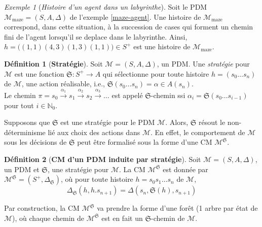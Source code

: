 \documentclass[12pt,a4paper]{report}
\theoremstyle{definition}%
\newtheorem{definition}{Définition}[chapter]
\theoremstyle{remark}
\newtheorem{example}{Exemple}[chapter]
\begin{document}
\begin{example}[\textit{Histoire d'un agent dans un labyrinthe}]
	Soit le PDM $\mathcal{M}_{\text{maze}} = (S, A, \Delta)$ de l'exemple \ref{maze-agent}.
	Une histoire de $\mathcal{M}_{\text{maze}}$ correspond, dans cette situation,
	à la succession de cases qui forment un chemin fini de l'agent lorsqu'il se deplace dans le
	labyrinthe. Ainsi,
	$
		h = \big( (1, 1) (4, 3) (1, 3) (1, 1) \big) \in S^+
	$
	est une histoire de $\mathcal{M}_{\text{maze}}$.
\end{example}

\begin{definition}[\textbf{Stratégie}]
	Soit $\mathcal{M} = (S, A, \Delta)$, un PDM. Une \textit{stratégie} pour $\mathcal{M}$
	est une fonction
	$\mathfrak{S} : S^+ \rightarrow A$
	qui sélectionne pour toute histoire $h = (s_0 \dots s_n)$ de $\mathcal{M}$, une action réalisable, i.e., $\mathfrak{S}(s_0 \dots s_n) = \alpha \in A(s_n)$.
	\\Le chemin $\pi = s_0 \xrightarrow{\alpha_1} s_1 \xrightarrow{\alpha_2} s_2 \xrightarrow{\alpha_3} \dots$
	est appelé $\mathfrak{S}$-chemin ssi $\alpha_i = \mathfrak{S}(s_0 \dots s_{i-1})$
	pour tout $i \in \mathbb{N}_0$.
\end{definition}

Supposons que $\mathfrak{S}$ est une stratégie pour le PDM $\mathcal{M}$. Alors,
$\mathfrak{S}$ résout le non-déterminisme lié aux choix des actions dans $\mathcal{M}$.
En effet, le comportement de $\mathcal{M}$ sous les décisions de $\mathfrak{S}$
peut être formalisé sous la forme d'une CM $\mathcal{M}^{\mathfrak{S}}$.

\begin{definition}[\textbf{CM d'un PDM induite par stratégie}]
Soit $\mathcal{M} = (S, A, \Delta)$, un PDM et $\mathfrak{S}$, une stratégie pour
$\mathcal{M}$. La CM $\mathcal{M}^\mathfrak{S}$ est donnée par
$ \mathcal{M}^\mathfrak{S} = (S^+, \Delta_\mathfrak{S}) $, où pour toute histoire
$h = s_0 s_1 \dots s_n$ de $\mathcal{M}$,
\[\Delta_\mathfrak{S}(h, h . s_{n+1}) = \Delta(s_n, \mathfrak{S}(h), s_{n+1}) \]
\end{definition}

Par construction, la CM $\mathcal{M}^{\mathfrak{S}}$ va prendre la forme d'une forêt (1
arbre par état de $\mathcal{M}$), où chaque chemin de $\mathcal{M}^{\mathfrak{S}}$
est en fait un $\mathfrak{S}$-chemin de $\mathcal{M}$. \\
\end{document}
